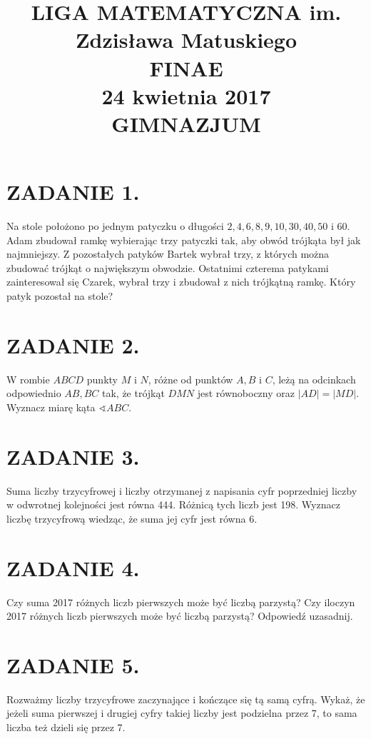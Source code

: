 \documentclass[10pt]{article}
\title{LIGA MATEMATYCZNA im. Zdzisława Matuskiego \\
 FINAE \\
 24 kwietnia 2017 \\
 GIMNAZJUM }
\author{}
\date{}
\newcommand\varangle{\mathop{\sphericalangle}}
\begin{document}
\maketitle
\section*{ZADANIE 1.}
Na stole położono po jednym patyczku o długości \(2,4,6,8,9,10,30,40,50\) i 60. Adam zbudował ramkę wybierając trzy patyczki tak, aby obwód trójkąta był jak najmniejszy. Z pozostałych patyków Bartek wybrał trzy, z których można zbudować trójkąt o największym obwodzie. Ostatnimi czterema patykami zainteresował się Czarek, wybrał trzy i zbudował z nich trójkątną ramkę. Który patyk pozostał na stole?

\section*{ZADANIE 2.}
W rombie \(A B C D\) punkty \(M\) i \(N\), różne od punktów \(A, B\) i \(C\), leżą na odcinkach odpowiednio \(A B, B C\) tak, że trójkąt \(D M N\) jest równoboczny oraz \(|A D|=|M D|\). Wyznacz miarę kąta \(\varangle A B C\).

\section*{ZADANIE 3.}
Suma liczby trzycyfrowej i liczby otrzymanej z napisania cyfr poprzedniej liczby w odwrotnej kolejności jest równa 444. Różnicą tych liczb jest 198. Wyznacz liczbę trzycyfrową wiedząc, że suma jej cyfr jest równa 6.

\section*{ZADANIE 4.}
Czy suma 2017 różnych liczb pierwszych może być liczbą parzystą? Czy iloczyn 2017 różnych liczb pierwszych może być liczbą parzystą? Odpowiedź uzasadnij.

\section*{ZADANIE 5.}
Rozważmy liczby trzycyfrowe zaczynające i kończące się tą samą cyfrą. Wykaż, że jeżeli suma pierwszej i drugiej cyfry takiej liczby jest podzielna przez 7, to sama liczba też dzieli się przez 7.
\end{document}
